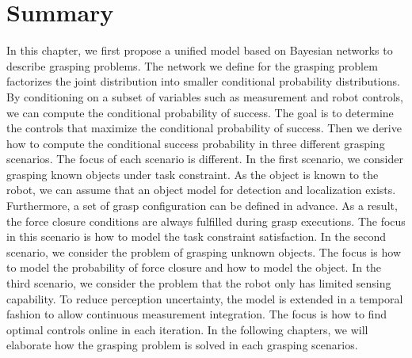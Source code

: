  \section{Summary}
 In this chapter, we first propose a unified model based on Bayesian networks to describe grasping problems. The network we define for the grasping problem factorizes the joint distribution into smaller conditional probability distributions. By conditioning on a subset of variables such as measurement and robot controls, we can compute the conditional probability of success. The goal is to determine the controls that maximize the conditional probability of success. Then we derive how to compute the conditional success probability in three different grasping scenarios. The focus of each scenario is different. In the first scenario, we consider grasping known objects under task constraint. As the object is known to the robot, we can assume that an object model for detection and localization exists. Furthermore, a set of grasp configuration can be defined in advance. As a result, the force closure conditions are always fulfilled during grasp executions. The focus in this scenario is how to model the task constraint satisfaction. In the second scenario, we consider the problem of grasping unknown objects. The focus is how to model the probability of force closure and how to model the object. In the third scenario, we consider the problem that the robot only has limited sensing capability. To reduce perception uncertainty, the model is extended in a temporal fashion to allow continuous measurement integration. The focus is how to find optimal controls online in each iteration. In the following chapters, we will elaborate how the grasping problem is solved in each grasping scenarios.




 
